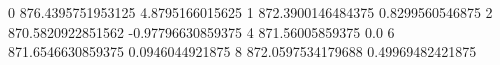 0 876.4395751953125 4.8795166015625
1 872.3900146484375 0.8299560546875
2 870.5820922851562 -0.97796630859375
4 871.56005859375 0.0
6 871.6546630859375 0.0946044921875
8 872.0597534179688 0.49969482421875
